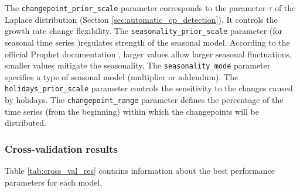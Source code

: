 The \verb|changepoint_prior_scale| parameter corresponds to the parameter $\tau$ of the Laplace distribution (Section \ref{sec:automatic_cp_detection}). It controls the growth rate change flexibility. The \verb|seasonality_prior_scale| parameter (for seasonal time series )regulates strength of the seasonal model. According to the official Prophet documentation \cite{ProphetDoc}, larger values allow larger seasonal fluctuations, smaller values mitigate the seasonality. The \verb|seasonality_mode| parameter specifies a type of seasonal model (multiplier or addendum). The \verb|holidays_prior_scale| parameter controls the sensitivity to the changes caused by holidays. The \verb|changepoint_range| parameter defines the percentage of the time series (from the beginning) within which the changepoints will be distributed.

\subsubsection{Cross-validation results}

Table \ref{tab:cross_val_res} contains information about the best performance parameters for each model.

